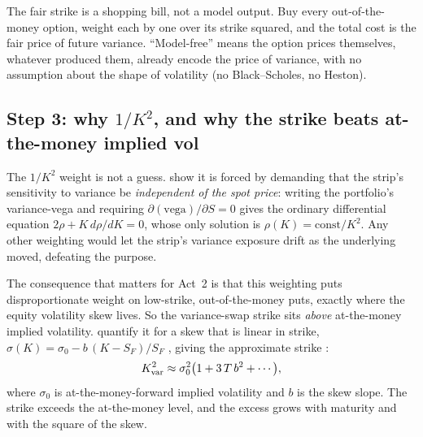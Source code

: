 \begin{intuition}
The fair strike is a shopping bill, not a model output. Buy every out-of-the-money option, weight each by one over its strike squared, and the total cost is the fair price of future variance. ``Model-free'' means the option prices themselves, whatever produced them, already encode the price of variance, with no assumption about the shape of volatility (no Black--Scholes, no Heston).
\end{intuition}

\subsection*{Step 3: why $1/K^2$, and why the strike beats at-the-money implied vol}

The $1/K^2$ weight is not a guess. \citet[App.~A, Eq.~A3, p.~38]{Demeterfi1999} show it is forced by demanding that the strip's sensitivity to variance be \emph{independent of the spot price}: writing the portfolio's variance-vega and requiring $\partial(\text{vega})/\partial S = 0$ gives the ordinary differential equation $2\rho + K\,d\rho/dK = 0$, whose only solution is $\rho(K) = \text{const}/K^2$. Any other weighting would let the strip's variance exposure drift as the underlying moved, defeating the purpose.

The consequence that matters for Act~2 is that this weighting puts disproportionate weight on low-strike, out-of-the-money puts, exactly where the equity volatility skew lives. So the variance-swap strike sits \emph{above} at-the-money implied volatility. \citet{Demeterfi1999} quantify it for a skew that is linear in strike, $\sigma(K) = \sigma_0 - b\,(K - S_F)/S_F$ \citep[Eq.~30, p.~23]{Demeterfi1999}, giving the approximate strike \citep[Eq.~31, p.~23]{Demeterfi1999}:
\begin{equation}
\label{eq:gsvivs:skew}
K_{\mathrm{var}}^2 \approx \sigma_0^2\big(1 + 3\,T\,b^2 + \cdots\big),
\end{equation}
where $\sigma_0$ is at-the-money-forward implied volatility and $b$ is the skew slope. The strike exceeds the at-the-money level, and the excess grows with maturity and with the square of the skew.

